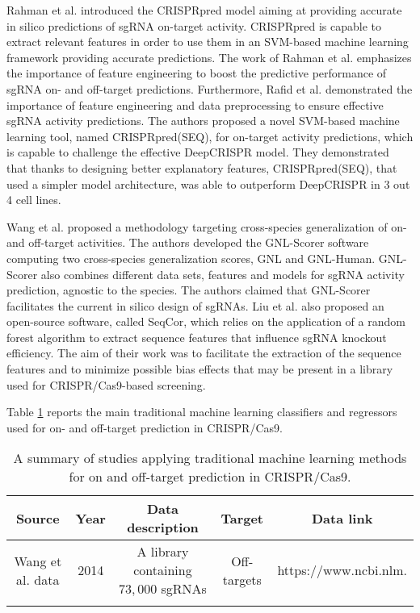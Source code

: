 \documentclass[unnumsec,webpdf,contemporary,large]{oup-authoring-template}
\theoremstyle{thmstyleone}%
\theoremstyle{thmstyletwo}%
\theoremstyle{thmstylethree}%
\begin{document}
Rahman et al. \cite{rahman2017crisprpred} introduced the CRISPRpred model aiming at providing accurate in silico predictions of sgRNA on-target activity. CRISPRpred is capable to extract relevant features in order to use them in an SVM-based machine learning framework providing accurate predictions. The work of Rahman et al. emphasizes the importance of feature engineering to boost the predictive performance of sgRNA on- and off-target predictions. Furthermore, Rafid et al. \cite{muhammad2020crisprpred} demonstrated the importance of feature engineering and data preprocessing to ensure effective sgRNA activity predictions. The authors proposed a novel SVM-based machine learning tool, named CRISPRpred(SEQ), for on-target activity predictions, which is capable to challenge the effective DeepCRISPR model. They demonstrated that thanks to designing better explanatory features, CRISPRpred(SEQ), that used a simpler model architecture, was able to outperform DeepCRISPR in 3 out 4 cell lines. 

Wang et al. \cite{wang2020gnl} proposed a methodology targeting cross-species generalization of on- and off-target activities. The authors developed the GNL-Scorer software computing two cross-species generalization scores, GNL and GNL-Human. GNL-Scorer also combines different data sets, features and models for sgRNA activity prediction, agnostic to the species. The authors claimed that GNL-Scorer facilitates the current in silico design of sgRNAs. Liu et al. \cite{liu2020seqcor} also proposed an open-source software, called SeqCor, which relies on the application of a random forest algorithm to extract sequence features that influence sgRNA knockout efficiency. The aim of their work was to facilitate the extraction of the sequence features and to minimize possible bias effects that may be present in a library used for CRISPR/Cas9-based screening.

Table \ref{tab2} reports the main traditional machine learning classifiers and regressors used for on- and off-target prediction in CRISPR/Cas9.

% 

\begin{longtable}{ccccc}
\caption{A summary of studies applying traditional machine learning methods for on and off-target prediction in CRISPR/Cas9. \label{tab2}}\\
\midrule
Source & Year & Data description & Target & Data link \\
\midrule
Wang et al. data \cite{wang2014genetic} & 2014 & A library containing $73,000$ sgRNAs & Off-targets & https://www.ncbi.nlm. \\
\botrule
\end{longtable}
\end{document}
